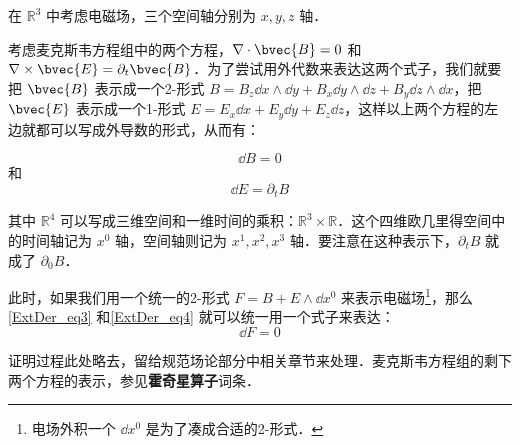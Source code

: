 在 $\mathbb{R}^3$ 中考虑电磁场，三个空间轴分别为 $x, y, z$ 轴．

考虑麦克斯韦方程组中的两个方程，$\nabla\cdot\bvec{B}=0$ 和 $\nabla\times\bvec{E}=\partial_t\bvec{B}$．为了尝试用外代数来表达这两个式子，我们就要把 $\bvec{B}$
表示成一个2-形式 $B=B_z\dd x\wedge\dd y+B_x\dd y\wedge\dd z+B_y\dd z\wedge\dd x$，把 $\bvec{E}$ 表示成一个1-形式 $E=E_x\dd x+E_y\dd y+E_z\dd z$，这样以上两个方程的左边就都可以写成外导数的形式，从而有：

\begin{equation}\label{ExtDer_eq3}
\dd B=0
\end{equation}
和
\begin{equation}\label{ExtDer_eq4}
\dd E=\partial_tB
\end{equation}

其中 $\mathbb{R}^4$ 可以写成三维空间和一维时间的乘积：$\mathbb{R}^3\times\mathbb{R}$．这个四维欧几里得空间中的时间轴记为 $x^0$ 轴，空间轴则记为 $x^1, x^2, x^3$ 轴．要注意在这种表示下，$\partial_tB$ 就成了 $\partial_0B$．

此时，如果我们用一个统一的2-形式 $F=B+E\wedge\dd x^0$ 来表示电磁场\footnote{电场外积一个 $\dd x^0$ 是为了凑成合适的2-形式．}，那么\autoref{ExtDer_eq3} 和\autoref{ExtDer_eq4} 就可以统一用一个式子来表达：
\begin{equation}
\dd F=0
\end{equation}

证明过程此处略去，留给规范场论部分中相关章节来处理．麦克斯韦方程组的剩下两个方程的表示，参见\textbf{霍奇星算子}词条．


